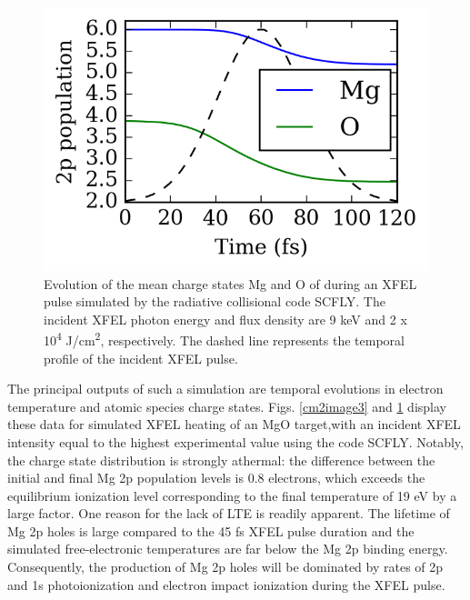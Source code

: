 \begin{figure}[h] \label{cm2image4}
\caption{
Evolution of the mean charge states Mg and O of during
an XFEL pulse simulated by the radiative collisional code SCFLY. The
incident XFEL photon energy and flux density are 9 keV and 2 x
10\textsuperscript{4} J/cm\textsuperscript{2}, respectively. The dashed
line represents the temporal profile of the incident XFEL pulse.
}
\centering
\includegraphics{MgO_2.7.docx1503027860/media/image4.png}
\end{figure}

The principal outputs of such a simulation are temporal evolutions in
electron temperature and atomic species charge states. Figs. \ref{cm2image3} and \ref{cm2image4}
display these data for simulated XFEL heating of an MgO target,with an
incident XFEL intensity equal to the highest experimental value using
the code SCFLY. Notably, the charge state distribution is strongly
athermal: the difference between the initial and final Mg 2p population
levels is 0.8 electrons, which exceeds the equilibrium ionization level
corresponding to the final temperature of 19 eV by a large factor. One
reason for the lack of LTE is readily apparent. The lifetime of Mg 2p
holes is large compared to the 45 fs XFEL pulse duration \cite{keski1974total, fuggle1992unoccupied} and
the simulated free-electronic temperatures are far below the Mg 2p
binding energy. Consequently, the production of Mg 2p holes will be
dominated by rates of 2p and 1s photoionization and electron impact
ionization during the XFEL pulse.

\FloatBarrier

